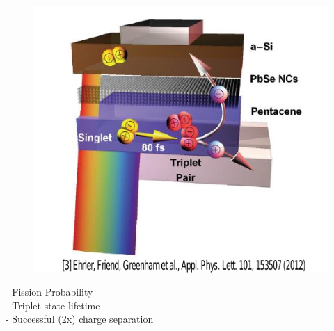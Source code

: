 \documentclass[compress]{beamer}
\begin{document}
\begin{frame}
\begin{multicols}{2}
\begin{figure}[H]
\includegraphics[width=1.2\columnwidth]{../img/SF_esq3.pdf}
\end{figure}
\small
\hspace{-15pt}- Fission Probability\\
\hspace{-15pt}- Triplet-state lifetime\\
\hspace{-15pt}- Successful (2x) charge separation
\end{multicols}


\end{frame}
\end{document}
